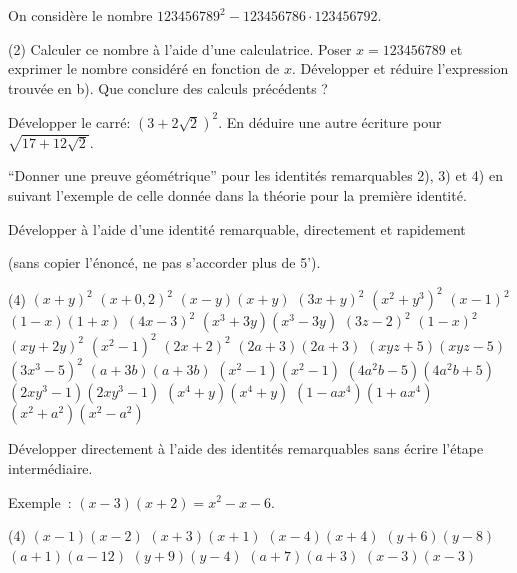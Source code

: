 \documentclass[a4paper,12pt]{report}
\begin{document}
\begin{acti}
On considère le nombre $123456789^2-123456786 \cdot 123456792$.
\begin{tasks}(2)
\task Calculer ce nombre à l'aide d'une calculatrice.
\task Poser $x=123456789$ et exprimer le nombre considéré en fonction de $x$.
\task Développer et réduire l'expression trouvée en b).
\task Que conclure des calculs précédents ?
\end{tasks}	
\end{acti}
\begin{acti}
Développer le carré: $(3+2 \sqrt{2})^2$. En déduire une autre écriture pour $\sqrt{17+12 \sqrt{2}}$.
\end{acti}
\begin{exo}
\enquote{Donner une preuve géométrique} pour les identités remarquables 2), 3) et 4) en suivant l'exemple de celle donnée dans la théorie pour la première identité.
\end{exo}
\begin{exo}
Développer à l'aide d'une identité remarquable, directement et rapidement 

(sans copier l'énoncé, ne pas s'accorder plus de 5').
	\begin{tasks}(4)
\task $(x+y)^2$
\task $(x+0,2)^2$
\task $(x-y)(x+y)$
\task $(3 x+y)^2$
\task $\left(x^2+y^3\right)^2$
\task $(x-1)^2$
\task $(1-x)(1+x)$
\task $(4 x-3)^2$
\task $\left(x^3+3 y\right)\left(x^3-3 y\right)$
\task $(3 z-2)^2$
\task $(1-x)^2$
\task $(x y+2 y)^2$
\task $\left(x^2-1\right)^2$
\task $(2 x+2)^2$
\task $(2 a+3)(2 a+3)$
\task $(x y z+5)(x y z-5)$
\task $\left(3 x^3-5\right)^2$
\task $(a+3 b)(a+3 b)$
\task $\left(x^2-1\right)\left(x^2-1\right)$
\task $\left(4 a^2 b-5\right)\left(4 a^2 b+5\right)$
\task $\left(2 x y^3-1\right)\left(2 x y^3-1\right)$
\task $\left(x^4+y\right)\left(x^4+y\right)$
\task $\left(1-a x^4\right)\left(1+a x^4\right)$
\task $\left(x^2+a^2\right)\left(x^2-a^2\right)$
	\end{tasks}
\end{exo}
\begin{exo}
Développer directement à l'aide des identités remarquables sans écrire l'étape intermédiaire.

Exemple~: $(x-3)(x+2)=x^2-x-6$.
	\begin{tasks}(4)
\task $(x-1)(x-2)$
\task $(x+3)(x+1)$
\task $(x-4)(x+4)$
\task $(y+6)(y-8)$
\task $(a+1)(a-12)$
\task $(y+9)(y-4)$
\task $(a+7)(a+3)$
\task $(x-3)(x-3)$
	\end{tasks}
\end{exo}
\end{document}

